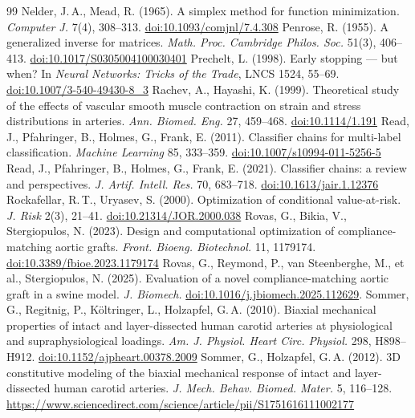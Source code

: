 \begin{thebibliography}{99}
 Nelder, J.\,A., Mead, R. (1965). A simplex method for function minimization. \emph{Computer J.} 7(4), 308--313. \href{https://doi.org/10.1093/comjnl/7.4.308}{doi:10.1093/comjnl/7.4.308}
 Penrose, R. (1955). A generalized inverse for matrices. \emph{Math. Proc. Cambridge Philos. Soc.} 51(3), 406--413. \href{https://doi.org/10.1017/S0305004100030401}{doi:10.1017/S0305004100030401}
 Prechelt, L. (1998). Early stopping --- but when? In \emph{Neural Networks: Tricks of the Trade}, LNCS 1524, 55--69. \href{https://doi.org/10.1007/3-540-49430-8_3}{doi:10.1007/3-540-49430-8\_3}
 Rachev, A., Hayashi, K. (1999). Theoretical study of the effects of vascular smooth muscle contraction on strain and stress distributions in arteries. \emph{Ann. Biomed. Eng.} 27, 459--468. \href{https://doi.org/10.1114/1.191}{doi:10.1114/1.191}
 Read, J., Pfahringer, B., Holmes, G., Frank, E. (2011). Classifier chains for multi-label classification. \emph{Machine Learning} 85, 333--359. \href{https://doi.org/10.1007/s10994-011-5256-5}{doi:10.1007/s10994-011-5256-5}
 Read, J., Pfahringer, B., Holmes, G., Frank, E. (2021). Classifier chains: a review and perspectives. \emph{J. Artif. Intell. Res.} 70, 683--718. \href{https://doi.org/10.1613/jair.1.12376}{doi:10.1613/jair.1.12376}
 Rockafellar, R.\,T., Uryasev, S. (2000). Optimization of conditional value-at-risk. \emph{J. Risk} 2(3), 21--41. \href{https://doi.org/10.21314/JOR.2000.038}{doi:10.21314/JOR.2000.038}
 Rovas, G., Bikia, V., Stergiopulos, N. (2023). Design and computational optimization of compliance-matching aortic grafts. \emph{Front. Bioeng. Biotechnol.} 11, 1179174. \href{https://doi.org/10.3389/fbioe.2023.1179174}{doi:10.3389/fbioe.2023.1179174}
 Rovas, G., Reymond, P., van Steenberghe, M., et al., Stergiopulos, N. (2025). Evaluation of a novel compliance-matching aortic graft in a swine model. \emph{J. Biomech.} \href{https://doi.org/10.1016/j.jbiomech.2025.112629}{doi:10.1016/j.jbiomech.2025.112629}.
 Sommer, G., Regitnig, P., Költringer, L., Holzapfel, G.\,A. (2010). Biaxial mechanical properties of intact and layer-dissected human carotid arteries at physiological and supraphysiological loadings. \emph{Am. J. Physiol. Heart Circ. Physiol.} 298, H898--H912. \href{https://doi.org/10.1152/ajpheart.00378.2009}{doi:10.1152/ajpheart.00378.2009}
 Sommer, G., Holzapfel, G.\,A. (2012). 3D constitutive modeling of the biaxial mechanical response of intact and layer-dissected human carotid arteries. \emph{J. Mech. Behav. Biomed. Mater.} 5, 116--128. \url{https://www.sciencedirect.com/science/article/pii/S1751616111002177}

\end{thebibliography}
